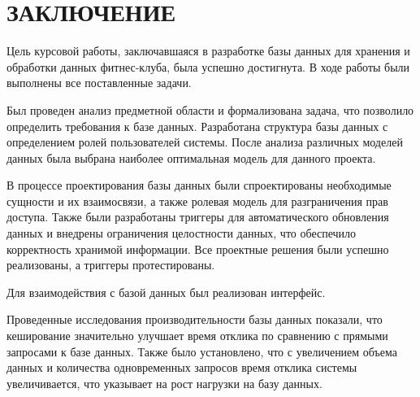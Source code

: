 \section*{ЗАКЛЮЧЕНИЕ}

Цель курсовой работы, заключавшаяся в разработке базы данных для хранения и обработки данных фитнес-клуба, была успешно достигнута. В ходе работы были выполнены все поставленные задачи.

Был проведен анализ предметной области и формализована задача, что позволило определить требования к базе данных. Разработана структура базы данных с определением ролей пользователей системы. После анализа различных моделей данных была выбрана наиболее оптимальная модель для данного проекта.

В процессе проектирования базы данных были спроектированы необходимые сущности и их взаимосвязи, а также ролевая модель для разграничения прав доступа. Также были разработаны триггеры для автоматического обновления данных и внедрены ограничения целостности данных, что обеспечило корректность хранимой информации. Все проектные решения были успешно реализованы, а триггеры протестированы.

Для взаимодействия с базой данных был реализован интерфейс.

Проведенные исследования производительности базы данных показали, что кеширование значительно улучшает время отклика по сравнению с прямыми запросами к базе данных. Также было установлено, что с увеличением объема данных и количества одновременных запросов время отклика системы увеличивается, что указывает на рост нагрузки на базу данных.